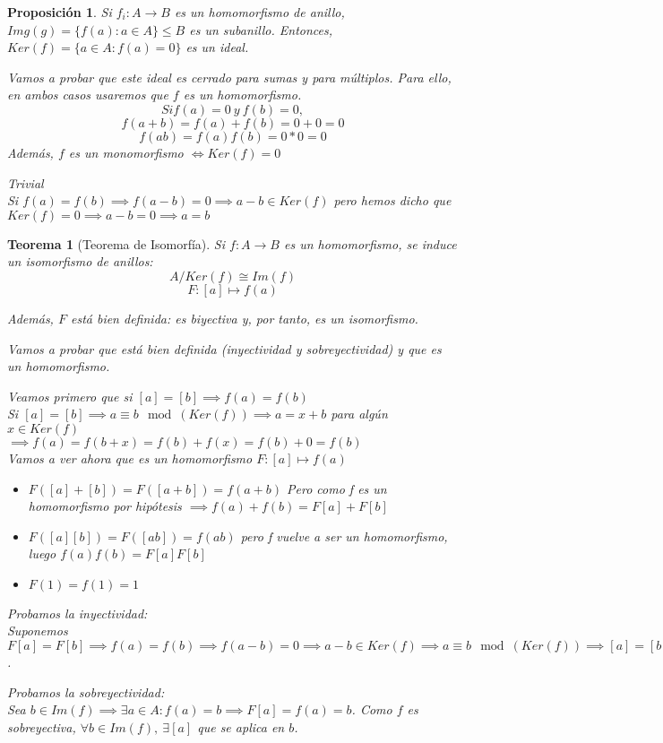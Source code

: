 \documentclass[11pt, a4paper, titlepage]{article}
\makeatletter
\renewenvironment{proof}[1][\proofname] {\vspace{-15pt}\par\pushQED{\qed}\normalfont\topsep6\p@\@plus6\p@\relax\trivlist\item[\hskip\labelsep\it#1\@addpunct{.}]\ignorespaces}{\popQED\endtrivlist\@endpefalse}
\theoremstyle{theorem-style}
\newtheorem*{nth}{Teorema}
\newtheorem*{nprop}{Proposición}
\theoremstyle{definition-style}
\theoremstyle{remark-style}
\theoremstyle{example-style}
\makeatother
\begin{document}
\begin{nprop}
	Si $f_i:A \to B$ es un homomorfismo de anillo, $Img(g) = \{f(a): a \in A\} \leq B$ es un subanillo. Entonces, $Ker(f) = \{a \in A: f(a) = 0\}$ es un ideal.
	\begin{proof}
	Vamos a probar que este ideal es cerrado para sumas y para múltiplos. Para ello, en ambos casos usaremos que $f$ es un homomorfismo.
	\[
	Si f(a) = 0 \ y \ f(b) = 0,\]\[
	f(a+b) = f(a)+f(b) = 0 + 0 = 0\]\[
	f(ab) = f(a)f(b) = 0*0 = 0
	\]
\end{proof}
Además, $f$ es un monomorfismo $\iff Ker(f) = 0$
\begin{proof}
	\boxed{\Rightarrow} Trivial\\
	\boxed{\Leftarrow} Si $f(a) = f(b) \implies f(a-b) = 0 \implies a-b \in Ker(f)$ pero hemos dicho que $Ker(f) = 0 \implies a-b = 0 \implies a = b$
\end{proof}
\end{nprop}

\begin{nth}[Teorema de Isomorfía]
	Si $f:A \to B$ es un homomorfismo, se induce un isomorfismo de anillos:
	\[
	A/Ker(f) \cong Im(f)
	\]
	\[
	F:[a] \longmapsto f(a)
	\]
	
Además, $F$ está bien definida: es biyectiva y, por tanto, es un isomorfismo.

\begin{proof}
	Vamos a probar que está bien definida (inyectividad y sobreyectividad) y que es un homomorfismo.
	
	Veamos primero que si $[a] = [b] \implies f(a) = f(b)$\\
	Si $[a] = [b] \implies a \equiv b \mod(Ker(f)) \implies a = x+b$ para algún $x\in Ker(f)$\\
	$\implies f(a) = f(b+x) = f(b) +f(x) = f(b) + 0 = f(b)$\\
	
	Vamos a ver ahora que es un homomorfismo $F:[a] \mapsto f(a)$
	\begin{itemize}
		\item $F([a]+[b]) = F([a+b]) = f(a+b)$ Pero como f es un homomorfismo por hipótesis $\implies f(a)+f(b) = F[a] + F[b]$
		\item $F([a][b]) = F([ab]) = f(ab)$ pero f vuelve a ser un homomorfismo, luego $f(a)f(b) = F[a]F[b]$
		\item $F(1) = f(1) = 1$
\end{itemize}
Probamos la inyectividad:\\
Suponemos $F[a] = F[b] \implies f(a) = f(b) \implies f(a-b) = 0 \implies a-b \in Ker(f) \implies a \equiv b\mod(Ker(f)) \implies [a] = [b]$.

Probamos la sobreyectividad:\\
Sea $b \in Im(f) \implies \exists a \in A : f(a) = b \implies F[a] = f(a) = b$. Como $f$ es sobreyectiva, $\forall b \in Im(f), \ \exists [a]$ que se aplica en $b$.
\end{proof}

\end{nth}
\end{document}
